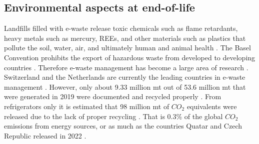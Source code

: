 \subsection{Environmental aspects at end-of-life}

Landfills filled with e-waste release toxic chemicals such as flame retardants, heavy metals such as mercury, REEs, and other materials such as plastics that pollute the soil, water, air, and ultimately human and animal health \cite{javed2024}. The Basel Convention prohibits the export of hazardous waste from developed to developing countries \cite{baselconv}. Therefore e-waste management has become a large area of research \cite{javed2024}. Switzerland and the Netherlands are currently the leading countries in e-waste management \cite{javed2024}. However, only about 9.33 million mt out of 53.6 million mt that were generated in 2019 were documented and recycled properly \cite{javed2024}. From refrigerators only it is estimated that 98 million mt of $CO_2$ equivalents were released due to the lack of proper recycling \cite{javed2024}. That is 0.3\% of the global $CO_2$ emissions from energy sources, or as much as the countries Quatar and Czech Republic released in 2022 \cite{co2emissions}.

